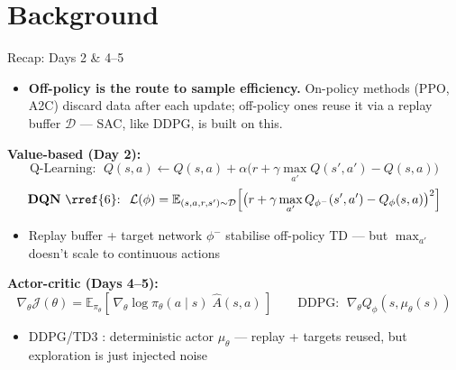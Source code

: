 \section{Background}
\begin{frame}{Recap: Days 2 \& 4--5}
\small
\begin{itemize}
    \item \textbf{Off-policy is the route to sample efficiency.} On-policy methods (PPO, A2C) discard data after each update; off-policy ones reuse it via a replay buffer $\mathcal{D}$ --- SAC, like DDPG, is built on this.
\end{itemize}
\vspace{-0.3em}
\textbf{Value-based (Day 2):}
\[
\text{Q-Learning: }\; Q(s,a) \leftarrow Q(s,a) + \alpha\big( r + \gamma \max_{a'} Q(s',a') - Q(s,a) \big)
\]
\[
\textbf{DQN}~\rref{6}\text{: }\; \mathcal{L}(\phi) = \mathbb{E}_{(s,a,r,s') \sim \mathcal{D}}\!\left[ \big( r + \gamma \max_{a'} Q_{\phi^{-}}(s',a') - Q_\phi(s,a) \big)^{2} \right]
\]
\vspace{-0.7em}
\begin{itemize}
    \item Replay buffer + target network $\phi^-$ stabilise off-policy TD --- but $\max_{a'}$ doesn't scale to continuous actions
\end{itemize}
\vspace{-0.3em}
\textbf{Actor-critic (Days 4--5):}
\[
\nabla_\theta\mathcal{J}(\theta) = \mathbb{E}_{\pi_\theta}\!\left[\, \nabla_\theta\log\pi_\theta(a\mid s)\; \hat{A}(s,a) \,\right] \qquad
\text{DDPG: }\; \nabla_\theta Q_\phi(s,\mu_\theta(s))
\]
\begin{itemize}
    \item DDPG/TD3 : deterministic actor $\mu_\theta$ --- replay + targets reused, but exploration is just injected noise
\end{itemize}
\end{frame}
